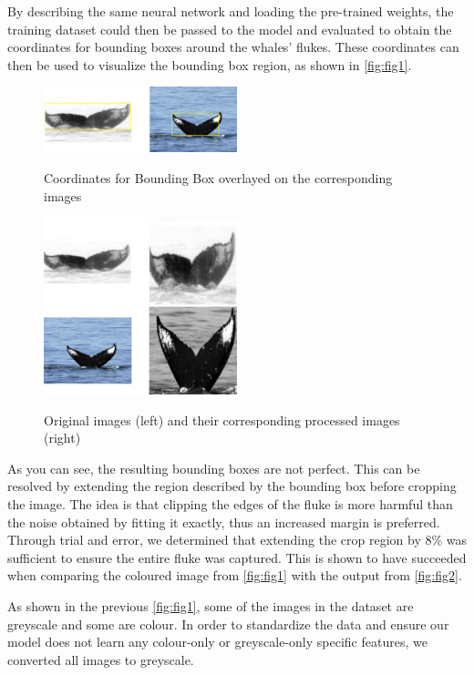 \documentclass[paper=a4, fontsize=11pt]{scrartcl}
\numberwithin{equation}{section}		%
\numberwithin{table}{section}				%
\begin{document}
By describing the same neural network and loading the pre-trained weights, the training dataset could then be passed to the model and evaluated to obtain the coordinates for bounding boxes around the whales' flukes. These coordinates can then be used to visualize the bounding box region, as shown in \autoref{fig:fig1}.

\begin{figure}[h]
    \caption{Coordinates for Bounding Box overlayed on the corresponding images}
    \centering
    \includegraphics[width=0.5\textwidth]{BoundingBoxExample.png}
    \label{fig:fig1}
\end{figure}

\begin{figure}[h]
    \caption{Original images (left) and their corresponding processed images (right)}
    \centering
    \includegraphics[width=0.5\textwidth]{ProcessedImages.png}
    \label{fig:fig2}
\end{figure}

As you can see, the resulting bounding boxes are not perfect. This can be resolved by extending the region described by the bounding box before cropping the image. The idea is that clipping the edges of the fluke is more harmful than the noise obtained by fitting it exactly, thus an increased margin is preferred. Through trial and error, we determined that extending the crop region by 8\% was sufficient to ensure the entire fluke was captured. This is shown to have succeeded when comparing the coloured image from \autoref{fig:fig1} with the output from \autoref{fig:fig2}.

As shown in the previous \autoref{fig:fig1}, some of the images in the dataset are greyscale and some are colour. In order to standardize the data and ensure our model does not learn any colour-only or greyscale-only specific features, we converted all images to greyscale.
\end{document}
